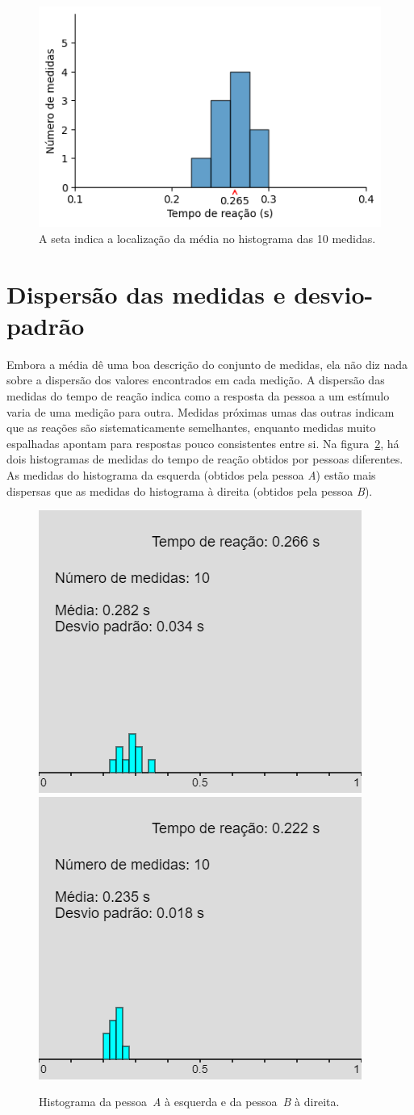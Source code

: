 \documentclass[12pt, a4paper]{article}
\begin{document}
\begin{figure}[H]
    \centering
    \includegraphics[width=0.55\linewidth]{histograma princ..png}
    \caption{A seta indica a localização da média no histograma das 10 medidas.}
    \label{histograma princ}
\end{figure}


\section{Dispersão das medidas e desvio-padrão}

Embora a média dê uma boa descrição do conjunto de medidas, ela não diz nada sobre a dispersão dos valores encontrados em cada medição. A dispersão das medidas do tempo de reação indica como a resposta da pessoa a um estímulo varia de uma medição para outra. Medidas próximas umas das outras indicam que as reações são sistematicamente semelhantes, enquanto medidas muito espalhadas apontam para respostas pouco consistentes entre si. Na figura~\ref{consistência}, há dois histogramas de medidas do tempo de reação obtidos por pessoas diferentes. As medidas do histograma da esquerda (obtidos pela pessoa \textit{A}) estão mais dispersas que as medidas do histograma à direita (obtidos pela pessoa \textit{B}).

\begin{figure}[H]
    \centering
    \includegraphics[width=0.4\linewidth]{app7.png}~
    \includegraphics[width=0.4\linewidth]{app8.png}
    \caption{ Histograma da pessoa~\textit{A} à esquerda e da pessoa~\textit{B} à direita.}
    \label{consistência}
\end{figure}
\end{document}
